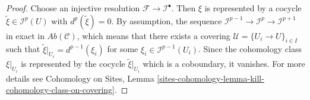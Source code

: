 \documentclass[10pt,a4paper]{amsart}
\theoremstyle{plain}
\theoremstyle{definition}
\theoremstyle{remark}
\numberwithin{equation}{subsection}
\begin{document}
\begin{proof}
Choose an injective resolution $\mathcal{F} \to \mathcal{I}^\bullet$. Then
$\xi$ is represented by a cocycle $\tilde{\xi} \in \mathcal{I}^p(U)$
with $d^p(\tilde{\xi}) = 0$. By assumption, the sequence
$\mathcal{I}^{p - 1} \to \mathcal{I}^p \to \mathcal{I}^{p + 1}$ in exact in
$\textit{Ab}(\mathcal{C})$, which means that there exists a covering
$\mathcal{U} = \{U_i \to U\}_{i \in I}$ such that
$\tilde{\xi}|_{U_i} = d^{p - 1}(\xi_i)$ for some
$\xi_i \in \mathcal{I}^{p-1}(U_i)$. Since
the cohomology class $\xi|_{U_i}$ is represented by the cocycle
$\tilde{\xi}|_{U_i}$ which is a coboundary, it vanishes.
For more details see
Cohomology on Sites,
Lemma \ref{sites-cohomology-lemma-kill-cohomology-class-on-covering}.
\end{proof}
\end{document}
